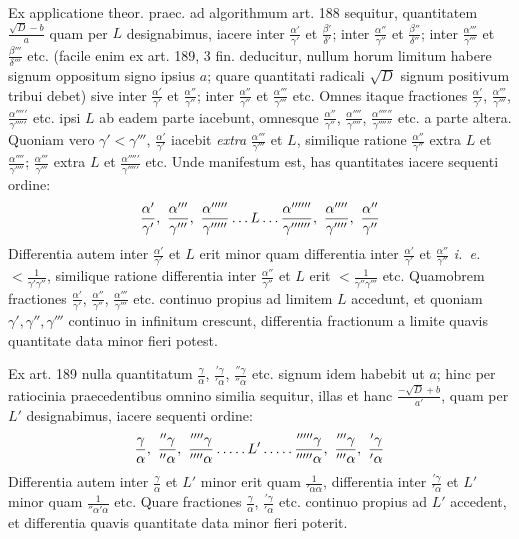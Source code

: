 Ex applicatione theor. praec. ad algorithmum art. 188 sequitur, quantitatem $\frac{\surd D-b}{a}$ quam per $L$ designabimus, iacere inter $\frac{\alpha'}{\gamma'}$ et $\frac{\beta'}{\delta'}$; inter $\frac{\alpha''}{\gamma''}$ et $\frac{\beta''}{\delta''}$; inter $\frac{\alpha'''}{\gamma'''}$ et $\frac{\beta'''}{\delta'''}$ etc. (facile enim ex art. 189, 3 fin. deducitur, nullum horum limitum habere signum oppositum signo ipsius $a$; quare quantitati radicali $\surd D$ signum positivum tribui debet) sive inter $\frac{\alpha'}{\gamma'}$ et $\frac{\alpha''}{\gamma''}$; inter $\frac{\alpha''}{\gamma''}$ et $\frac{\alpha'''}{\gamma'''}$ etc. Omnes itaque fractiones $\frac{\alpha'}{\gamma'}$, $\frac{\alpha'''}{\gamma'''}$, $\frac{\alpha'''''}{\gamma'''''}$ etc. ipsi $L$ ab eadem parte iacebunt, omnesque $\frac{\alpha''}{\gamma''}$, $\frac{\alpha''''}{\gamma''''}$, $\frac{\alpha''''''}{\gamma''''''}$ etc. a parte altera. Quoniam vero $\gamma'<\gamma'''$, $\frac{\alpha'}{\gamma'}$ iacebit \textit{extra} $\frac{\alpha'''}{\gamma'''}$ et $L$, similique ratione $\frac{\alpha''}{\gamma''}$ extra $L$ et $\frac{\alpha''''}{\gamma''''}$; $\frac{\alpha'''}{\gamma'''}$ extra $L$ et $\frac{\alpha'''''}{\gamma'''''}$ etc. Unde manifestum est, has quantitates iacere sequenti ordine:
\[
\frac{\alpha'}{\gamma'},\ \frac{\alpha'''}{\gamma'''},\ \frac{\alpha'''''}{\gamma'''''}\mathinner{\ldotp\ldotp\ldotp} L\mathinner{\ldotp\ldotp\ldotp}\frac{\alpha''''''}{\gamma''''''},\ \frac{\alpha''''}{\gamma''''},\ \frac{\alpha''}{\gamma''}
\]
Differentia autem inter $\frac{\alpha'}{\gamma'}$ et $L$ erit minor quam differentia inter $\frac{\alpha'}{\gamma'}$ et $\frac{\alpha''}{\gamma''}$ \textit{i. e.} $<\frac{1}{\gamma'\gamma''}$, similique ratione differentia inter $\frac{\alpha''}{\gamma''}$ et $L$ erit $<\frac{1}{\gamma''\gamma'''}$ etc. Quamobrem fractiones $\frac{\alpha'}{\gamma'}$, $\frac{\alpha''}{\gamma''}$, $\frac{\alpha'''}{\gamma'''}$ etc. continuo propius ad limitem $L$ accedunt, et quoniam $\gamma',\gamma'',\gamma'''$ continuo in infinitum crescunt, differentia fractionum a limite quavis quantitate data minor fieri potest.

Ex art. 189 nulla quantitatum $\frac{\gamma}{\alpha}$, $\frac{{}'\gamma}{{}'\alpha}$, $\frac{{}''\gamma}{{}''\alpha}$ etc. signum idem habebit ut $a$; hinc per ratiocinia praecedentibus omnino similia sequitur, illas et hanc $\frac{-\surd D+b}{a'}$, quam per $L'$ designabimus, iacere sequenti ordine:
\[
\frac{\gamma}{\alpha},\ \frac{{}''\gamma}{{}''\alpha},\ \frac{{}''''\gamma}{{}''''\alpha}\mathinner{\ldotp\ldotp\ldotp\ldotp\ldotp} L'\mathinner{\ldotp\ldotp\ldotp\ldotp\ldotp}\frac{{}'''''\gamma}{{}'''''\alpha},\ \frac{{}'''\gamma}{{}'''\alpha},\ \frac{{}'\gamma}{{}'\alpha}
\]
Differentia autem inter $\frac{\gamma}{\alpha}$ et $L'$ minor erit quam $\frac{1}{{}'\alpha\alpha}$, differentia inter $\frac{{}'\gamma}{{}'\alpha}$ et $L'$ minor quam $\frac{1}{{}''\alpha{}'\alpha}$ etc. Quare fractiones $\frac{\gamma}{\alpha}$, $\frac{{}'\gamma}{{}'\alpha}$ etc. continuo propius ad $L'$ accedent, et differentia quavis quantitate data minor fieri poterit.

